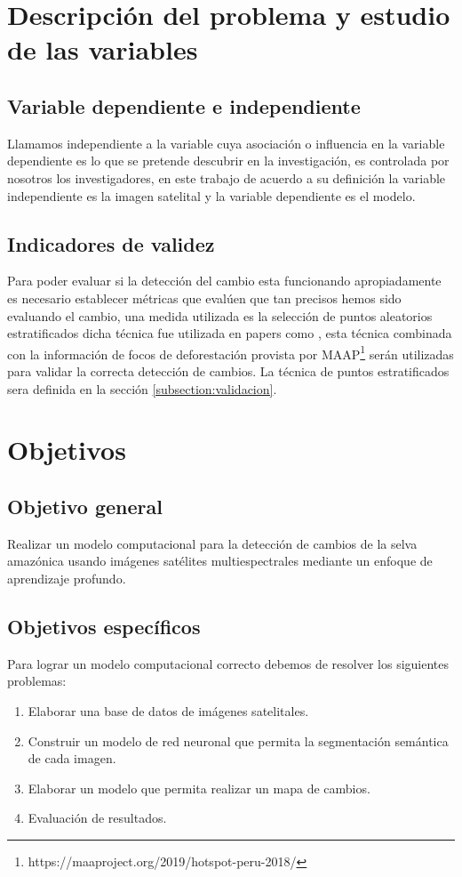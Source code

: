 \section{Descripción del problema y estudio de las variables}
\label{sec:ideacentral}


\subsection{Variable dependiente e independiente}
Llamamos independiente a la variable cuya asociación o influencia en la variable dependiente es lo que se pretende descubrir en la investigación, es controlada por nosotros los investigadores, en este trabajo de acuerdo a su definición la variable independiente es la imagen satelital y la variable dependiente es el modelo.\\
\subsection{Indicadores de validez}
Para poder evaluar si la detección del cambio esta funcionando apropiadamente es necesario establecer métricas que evalúen que tan precisos hemos sido evaluando el cambio, una medida utilizada es la selección de puntos aleatorios estratificados dicha técnica fue utilizada en papers como \cite{Lunetta2006 ,Olofsson2016 ,Diniz2015}, esta técnica combinada con la información de focos de deforestación provista por \gls{MAAP}\footnote{https://maaproject.org/2019/hotspot-peru-2018/}  serán utilizadas para validar la correcta detección de cambios. La técnica de puntos estratificados sera  definida en la sección \ref{subsection:validacion}.
\section{Objetivos}
\label{sec:objetivo}

\subsection{Objetivo general}
Realizar un modelo computacional para la detección de cambios de la selva amazónica usando imágenes satélites multiespectrales mediante un enfoque de aprendizaje profundo.
\subsection{Objetivos específicos}
Para lograr un modelo computacional correcto  debemos de resolver los siguientes problemas:
\begin{enumerate}
  \item Elaborar una base de datos de imágenes satelitales.


 \item Construir un modelo de red neuronal que permita la segmentación semántica de cada imagen.

 \item Elaborar un modelo que permita realizar un mapa de cambios. 
\item Evaluación de resultados.
\end{enumerate}

